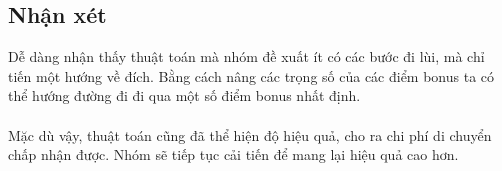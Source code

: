 \documentclass{article}
\begin{document}
\subsection{Nhận xét}
Dễ dàng nhận thấy thuật toán mà nhóm đề xuất ít có các bước đi lùi, mà chỉ tiến một hướng về đích. Bằng cách nâng các trọng số của các điểm bonus ta có thể hướng đường đi đi qua một số điểm bonus nhất định.
\\\\
Mặc dù vậy, thuật toán cũng đã thể hiện độ hiệu quả, cho ra chi phí di chuyển chấp nhận được. Nhóm sẽ tiếp tục cải tiến để mang lại hiệu quả cao hơn.



\end{document}
